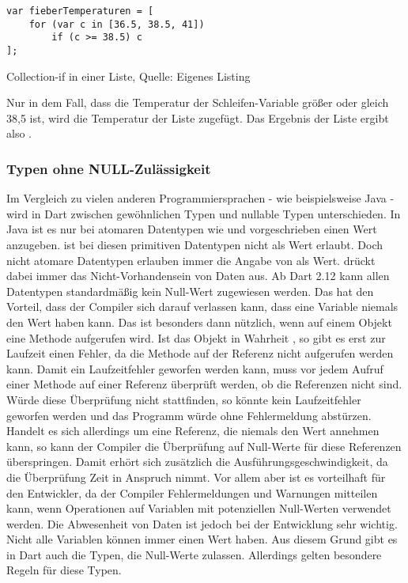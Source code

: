 \ifincludeall
  \begin{listing}[ht]
    \begin{verbatim}
var fieberTemperaturen = [
    for (var c in [36.5, 38.5, 41])
        if (c >= 38.5) c
];
\end{verbatim}
    \caption[Collection-if in einer Liste]{Collection-if in einer Liste, Quelle: Eigenes Listing}
    \label{lst:CollectionIfInEinerListe}
  \end{listing}
\fi

Nur in dem Fall, dass die Temperatur der Schleifen-Variable  größer oder gleich 38,5 ist, wird die Temperatur der Liste zugefügt.
Das Ergebnis der Liste  ergibt also \IC{[38.5, 41]}.


\subsubsection{Typen ohne NULL-Zulässigkeit} Im Vergleich zu vielen anderen Programmiersprachen - wie beispielsweise Java - wird in Dart zwischen gewöhnlichen Typen und nullable Typen unterschieden.
In Java ist es nur bei atomaren Datentypen wie  und  vorgeschrieben einen Wert anzugeben.
 ist bei diesen primitiven Datentypen nicht als Wert erlaubt.
Doch nicht atomare Datentypen erlauben immer die Angabe von  als Wert.
 drückt dabei immer das Nicht-Vorhandensein von Daten aus.
Ab Dart 2.12   kann allen Datentypen standardmäßig kein Null-Wert zugewiesen werden. Das hat den Vorteil, dass der Compiler sich darauf verlassen kann, dass eine Variable niemals den Wert  haben kann. Das ist besonders dann nützlich, wenn auf einem Objekt eine Methode aufgerufen wird. Ist das Objekt in Wahrheit , so gibt es erst zur Laufzeit einen Fehler, da die Methode auf der Referenz  nicht aufgerufen werden kann. Damit ein Laufzeitfehler geworfen werden kann, muss vor jedem Aufruf einer Methode auf einer Referenz überprüft werden, ob die Referenzen nicht  sind. Würde diese Überprüfung nicht stattfinden, so könnte kein Laufzeitfehler geworfen werden und das Programm würde ohne Fehlermeldung abstürzen. Handelt es sich allerdings um eine Referenz, die niemals den Wert  annehmen kann, so kann der Compiler die Überprüfung auf Null-Werte für diese Referenzen überspringen. Damit erhört sich zusätzlich die Ausführungsgeschwindigkeit, da die Überprüfung Zeit in Anspruch nimmt. Vor allem aber ist es vorteilhaft für den Entwickler, da der Compiler  Fehlermeldungen und Warnungen mitteilen kann, wenn Operationen auf Variablen mit potenziellen Null-Werten verwendet werden. Die Abwesenheit von Daten ist jedoch bei der Entwicklung sehr wichtig. Nicht alle Variablen können immer einen Wert haben. Aus diesem Grund gibt es in Dart auch die Typen, die Null-Werte zulassen. Allerdings gelten besondere Regeln für diese Typen.


